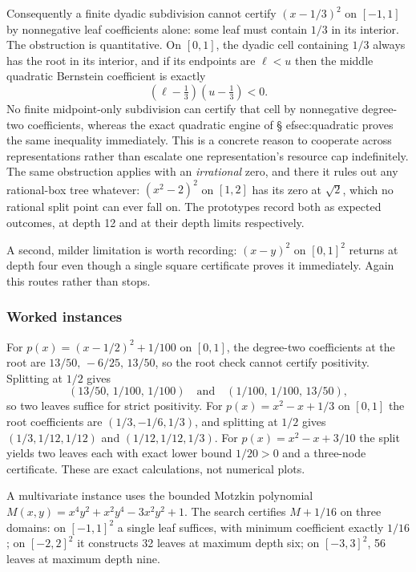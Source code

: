 Consequently a finite dyadic subdivision cannot certify $(x-1/3)^2$ on $[-1,1]$
by nonnegative leaf coefficients alone: some leaf must contain $1/3$ in its
interior. The obstruction is quantitative. On $[0,1]$, the dyadic cell
containing $1/3$ always has the root in its interior, and if its endpoints are
$\ell<u$ then the middle quadratic Bernstein coefficient is exactly
\[
 (\ell-\tfrac13)(u-\tfrac13)<0 .
\]
No finite midpoint-only subdivision can certify that cell by nonnegative
degree-two coefficients, whereas the exact quadratic engine of
\S
ef{sec:quadratic} proves the same inequality immediately. This is a
concrete reason to cooperate across representations rather than escalate one
representation's resource cap indefinitely. The same obstruction applies with an \emph{irrational} zero, and there
it rules out any rational-box tree whatever: $(x^2-2)^2$ on $[1,2]$ has its zero
at $\sqrt2$, which no rational split point can ever fall on. The prototypes
record both as expected \unknown{} outcomes, at depth 12 and at their depth
limits respectively.

A second, milder limitation is worth recording: $(x-y)^2$ on $[0,1]^2$ returns
\unknown{} at depth four even though a single square certificate proves it
immediately. Again this routes rather than stops.

\subsubsection*{Worked instances}

For $p(x)=(x-1/2)^2+1/100$ on $[0,1]$, the degree-two coefficients at the root
are $13/50,\,-6/25,\,13/50$, so the root check cannot certify positivity.
Splitting at $1/2$ gives
\[
 (13/50,\,1/100,\,1/100)\quad\text{and}\quad(1/100,\,1/100,\,13/50),
\]
so two leaves suffice for strict positivity. For $p(x)=x^2-x+1/3$ on $[0,1]$ the
root coefficients are $(1/3,-1/6,1/3)$, and splitting at $1/2$ gives
$(1/3,1/12,1/12)$ and $(1/12,1/12,1/3)$. For $p(x)=x^2-x+3/10$ the split yields
two leaves each with exact lower bound $1/20>0$ and a three-node certificate.
These are exact calculations, not numerical plots.

A multivariate instance uses the bounded Motzkin polynomial
$M(x,y)=x^4y^2+x^2y^4-3x^2y^2+1$. The search certifies $M+1/16$ on three
domains: on $[-1,1]^2$ a single leaf suffices, with minimum coefficient exactly
$1/16$; on $[-2,2]^2$ it constructs 32 leaves at maximum depth six; on
$[-3,3]^2$, 56 leaves at maximum depth nine.

